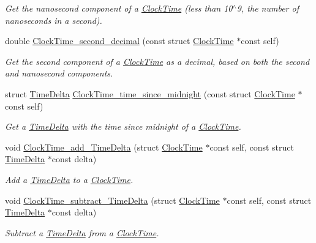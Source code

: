 \begin{DoxyCompactItemize}
\begin{DoxyCompactList}\small\item\em Get the nanosecond component of a \hyperlink{structClockTime}{Clock\-Time} (less than 10$^\wedge$9, the number of nanoseconds in a second). \end{DoxyCompactList}\item 
double \hyperlink{clock-time_8h_a182c395d606d26c144cdb75096a0125d}{Clock\-Time\-\_\-second\-\_\-decimal} (const struct \hyperlink{structClockTime}{Clock\-Time} $\ast$const self)
\begin{DoxyCompactList}\small\item\em Get the second component of a \hyperlink{structClockTime}{Clock\-Time} as a decimal, based on both the second and nanosecond components. \end{DoxyCompactList}\item 
struct \hyperlink{structTimeDelta}{Time\-Delta} \hyperlink{clock-time_8h_ace4db26641fe01b2edd311b09589ebbb}{Clock\-Time\-\_\-time\-\_\-since\-\_\-midnight} (const struct \hyperlink{structClockTime}{Clock\-Time} $\ast$const self)
\begin{DoxyCompactList}\small\item\em Get a \hyperlink{structTimeDelta}{Time\-Delta} with the time since midnight of a \hyperlink{structClockTime}{Clock\-Time}. \end{DoxyCompactList}\item 
void \hyperlink{clock-time_8h_a265e7bf3c63b2986d13dcdc8f43883d4}{Clock\-Time\-\_\-add\-\_\-\-Time\-Delta} (struct \hyperlink{structClockTime}{Clock\-Time} $\ast$const self, const struct \hyperlink{structTimeDelta}{Time\-Delta} $\ast$const delta)
\begin{DoxyCompactList}\small\item\em Add a \hyperlink{structTimeDelta}{Time\-Delta} to a \hyperlink{structClockTime}{Clock\-Time}. \end{DoxyCompactList}\item 
void \hyperlink{clock-time_8h_a9594699dbdbcd56c79928da5e969ba42}{Clock\-Time\-\_\-subtract\-\_\-\-Time\-Delta} (struct \hyperlink{structClockTime}{Clock\-Time} $\ast$const self, const struct \hyperlink{structTimeDelta}{Time\-Delta} $\ast$const delta)
\begin{DoxyCompactList}\small\item\em Subtract a \hyperlink{structTimeDelta}{Time\-Delta} from a \hyperlink{structClockTime}{Clock\-Time}. \end{DoxyCompactList}\item 

\end{DoxyCompactItemize}
